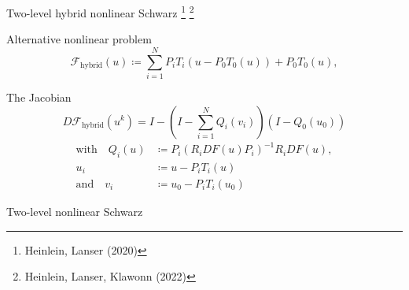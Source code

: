 \begin{frame}{Two-level hybrid nonlinear Schwarz  \footnote[2]{\tiny Heinlein, Lanser (2020)} \footnote[3]{\tiny Heinlein, Lanser, Klawonn (2022)}}
	\vspace*{-5mm}
	\begin{block}{\normalsize Alternative nonlinear problem}
		\begin{equation*}
            \mathcal{F}_{\text{hybrid}}(u) \coloneqq \sum_{i=1}^NP_iT_i(u-P_0T_0(u)) + P_0T_0(u),
		\end{equation*}
	\end{block}
	\begin{block}{\normalsize The Jacobian}
		\vspace*{-2mm}
		\begin{equation*}
            D\mathcal{F}_{\text{hybrid}}(u^k) = I - \left(I-\sum_{i=1}^NQ_i(v_i)\right)(I-Q_0(u_0))
		\end{equation*}
		\begin{align*}
			\text{with}\quad Q_i(u) & \coloneqq P_i(R_iDF(u)P_i)^{-1}R_iDF(u), \\
			u_i                     & \coloneqq u-P_iT_i(u)                    \\
			\text{and}\quad v_i     & \coloneqq u_0-P_iT_i(u_0)
		\end{align*}
	\end{block}
\end{frame}

\begin{frame}{Two-level nonlinear Schwarz}%
	
\end{frame}
